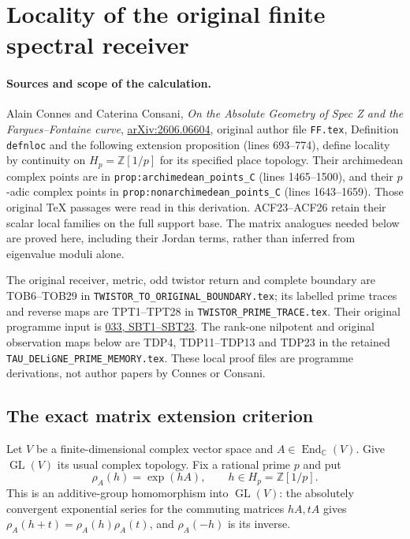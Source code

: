 \section{Locality of the original finite spectral receiver}
\label{sec:operator-locality-receiver}

\paragraph{Sources and scope of the calculation.}
Alain Connes and Caterina Consani, \emph{On the Absolute Geometry of
Spec Z and the Fargues--Fontaine curve},
\href{https://arxiv.org/abs/2606.06604}{arXiv:2606.06604}, original
author file \nolinkurl{FF.tex}, Definition \texttt{defnloc} and the
following extension proposition (lines 693--774), define locality by
continuity on $H_p=\mathbb Z[1/p]$ for its specified place topology.
Their archimedean complex points are in
\texttt{prop:archimedean\_points\_C} (lines 1465--1500), and their
$p$-adic complex points in \texttt{prop:nonarchimedean\_points\_C}
(lines 1643--1659). Those original TeX passages were read in this
derivation. ACF23--ACF26 retain their scalar local families on the
full support base. The matrix analogues needed below are proved here,
including their Jordan terms, rather than inferred from eigenvalue
moduli alone.

The original receiver, metric, odd twistor return and complete boundary
are TOB6--TOB29 in \nolinkurl{TWISTOR_TO_ORIGINAL_BOUNDARY.tex};
its labelled prime traces and reverse maps are TPT1--TPT28 in
\nolinkurl{TWISTOR_PRIME_TRACE.tex}. Their original programme input is
\href{https://github.com/KokunoYumeto/zeta-function-research-reader/blob/3c78cfbd9e194d35117b33277c421c6564ce3dbf/workbenches/splitzero-tandem/continuations/20260923-full-prime-support/033/MIXED_PRIME_ENERGY_AND_BOUNDARY.tex}{033,
SBT1--SBT23}. The rank-one nilpotent and original observation maps
below are TDP4, TDP11--TDP13 and TDP23 in the retained
\nolinkurl{TAU_DELiGNE_PRIME_MEMORY.tex}. These local proof files
are programme derivations, not author papers by Connes or Consani.

\subsection{The exact matrix extension criterion}

Let $V$ be a finite-dimensional complex vector space and
$A\in\operatorname{End}_{\mathbb C}(V)$. Give $\operatorname{GL}(V)$
its usual complex topology. Fix a rational prime $p$ and put
\[
\rho_A(h)=\exp(hA),\qquad h\in H_p=\mathbb Z[1/p].
\tag{OLR1}
\]
This is an additive-group homomorphism into $\operatorname{GL}(V)$:
the absolutely convergent exponential series for the commuting
matrices $hA,tA$ gives $\rho_A(h+t)=\rho_A(h)\rho_A(t)$,
and $\rho_A(-h)$ is its inverse.

